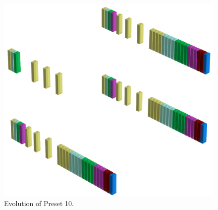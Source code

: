 \clearpage                                                                 
\begin{figure}[H]                                                          
  \centering                                                             
  \begin{adjustbox}{width=14cm,center}                                   
  \includegraphics[width=14cm]{src/presets/pattern10-45.png}%
  \end{adjustbox}                                                        
\caption{Evolution of Preset 10.}                                           
\end{figure}                                                               
\clearpage                                                                 
                                                                           
